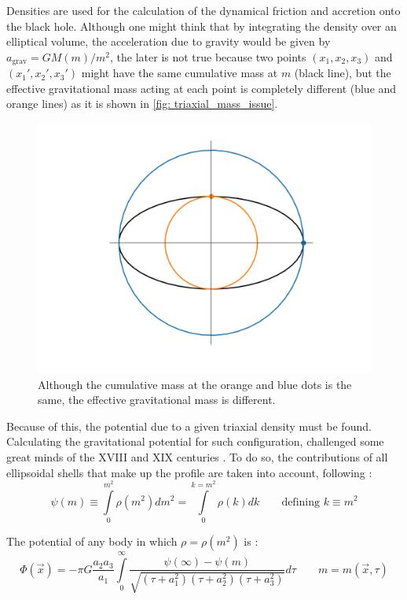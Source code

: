 	Densities are used for the calculation of the dynamical friction and accretion onto the black hole. Although one might think that by integrating the density over an elliptical volume, the acceleration due to gravity would be given by $a_\text{grav} = GM(m)/m^2$, the later is not true because two points $(x_1, x_2, x_3)$ and $(x_1', x_2', x_3')$ might have the same cumulative mass at $m$ (black line), but the effective gravitational mass acting at each point is completely different (blue and orange lines) as it is shown in \autoref{fig: triaxial_mass_issue}.
	
	\begin{figure}[h]
		\centering
		\includegraphics[width = 0.5\linewidth]{"../Files/Week 7/triaxial_mass_issue"}
		\caption{Although the cumulative mass at the orange and blue dots is the same, the effective gravitational mass is different.}
		\label{fig: triaxial_mass_issue}
	\end{figure}
	
	Because of this, the potential due to a given triaxial density must be found. Calculating the gravitational potential for such configuration, challenged some great minds of the XVIII and XIX centuries \cite{binney2011galactic}. To do so, the contributions of all ellipsoidal shells that make up the profile are taken into account, following \citeauthor{binney2011galactic}:
	\begin{equation}
		\psi(m) \equiv \int\limits_{0}^{m^2} \rho(m^2)dm^2 = \int\limits_{0}^{k = m^2} \rho(k)dk \qquad \text{defining $k \equiv m^2$} 
	\end{equation}
	
	The potential of any body in which $\rho = \rho(m^2)$ is \cite{binney2011galactic}:
	\begin{equation}
		\Phi(\vec{x}) = -\pi G \dfrac{a_2a_3}{a_1}\int\limits_{0}^{\infty}\dfrac{\psi(\infty) - \psi(m)}{\sqrt{(\tau + a_1^2)(\tau + a_2^2)(\tau + a_3^2)}}d\tau \qquad m = m(\vec{x}, \tau)
	\end{equation}
	
